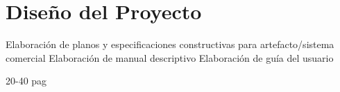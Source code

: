 \chapter{Diseño del Proyecto}


Elaboración de planos y especificaciones
constructivas para artefacto/sistema comercial
Elaboración de manual descriptivo
Elaboración de guía del usuario

20-40 pag
